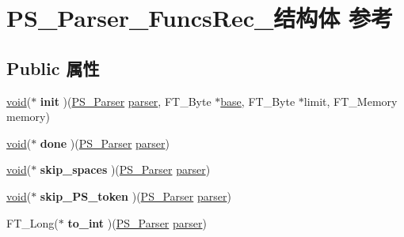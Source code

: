 \hypertarget{struct_p_s___parser___funcs_rec__}{}\section{P\+S\+\_\+\+Parser\+\_\+\+Funcs\+Rec\+\_\+结构体 参考}
\label{struct_p_s___parser___funcs_rec__}
\subsection*{Public 属性}
\begin{DoxyCompactItemize}
\item 
\mbox{\label{struct_p_s___parser___funcs_rec___a9cf5f71c64e8661135a04cdf7d0a655b}} 
\hyperlink{interfacevoid}{void}($\ast$ {\bfseries init} )(\hyperlink{struct_p_s___parser_rec__}{P\+S\+\_\+\+Parser} \hyperlink{structparser}{parser}, F\+T\+\_\+\+Byte $\ast$\hyperlink{structbase}{base}, F\+T\+\_\+\+Byte $\ast$limit, F\+T\+\_\+\+Memory memory)
\item 
\mbox{\label{struct_p_s___parser___funcs_rec___a8773f4b44c9bf75d0f3dd694e5be9f41}} 
\hyperlink{interfacevoid}{void}($\ast$ {\bfseries done} )(\hyperlink{struct_p_s___parser_rec__}{P\+S\+\_\+\+Parser} \hyperlink{structparser}{parser})
\item 
\mbox{\label{struct_p_s___parser___funcs_rec___a2ddd4735b8e65deac4a2f0f4984de16d}} 
\hyperlink{interfacevoid}{void}($\ast$ {\bfseries skip\+\_\+spaces} )(\hyperlink{struct_p_s___parser_rec__}{P\+S\+\_\+\+Parser} \hyperlink{structparser}{parser})
\item 
\mbox{\label{struct_p_s___parser___funcs_rec___a64dfe3d1fa75f0a00c08acddacd95f5c}} 
\hyperlink{interfacevoid}{void}($\ast$ {\bfseries skip\+\_\+\+P\+S\+\_\+token} )(\hyperlink{struct_p_s___parser_rec__}{P\+S\+\_\+\+Parser} \hyperlink{structparser}{parser})
\item 
\mbox{\label{struct_p_s___parser___funcs_rec___a0b07e18c6190ffcee54c5ba5d108fed5}} 
F\+T\+\_\+\+Long($\ast$ {\bfseries to\+\_\+int} )(\hyperlink{struct_p_s___parser_rec__}{P\+S\+\_\+\+Parser} \hyperlink{structparser}{parser})

\end{DoxyCompactItemize}

